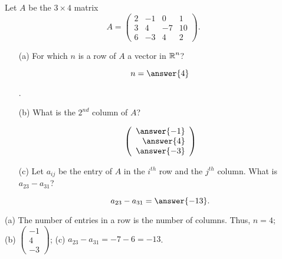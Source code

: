 \documentclass{ximera}
\begin{document}
\begin{exercise} \label{c1.1.2}
Let $A$ be the $3\times 4$ matrix
\[
A=\left(\begin{array}{rrrr} 2 & -1 & 0 & 1 \\ 3 & 4 & -7 & 10\\
        6 & -3 & 4 & 2 \end{array}\right).
\]
\begin{enumerate}
\item[(a)]  For which $n$ is a row of $A$ a vector in $\mbox{$\Bbb{R}$}^n$? \begin{prompt}\[n = \answer{4}\]\end{prompt}.
\item[(b)]  What is the $2^{nd}$ column of $A$?
  \begin{prompt}
    \[
      \left(\begin{array}{r} \answer{-1} \\ \answer{4} \\ \answer{-3} \end{array} \right)
    \]
  \end{prompt}
\item[(c)] Let $a_{ij}$ be the entry of $A$ in the $i^{th}$ row
  and the $j^{th}$ column.  What is $a_{23}-a_{31}$?
  \begin{prompt}
    \[
      a_{23}-a_{31} = \answer{-13}.
    \]
  \end{prompt}
\end{enumerate}

\begin{solution}

(a) The number of entries in a row is the number of columns.  Thus, $n = 4$; \\
(b) $\left(\begin{array}{r} -1 \\ 4 \\ -3 \end{array} \right)$;
(c) $a_{23}-a_{31} =  -7 - 6 = -13$.

\end{solution}
\end{exercise}
\end{document}
